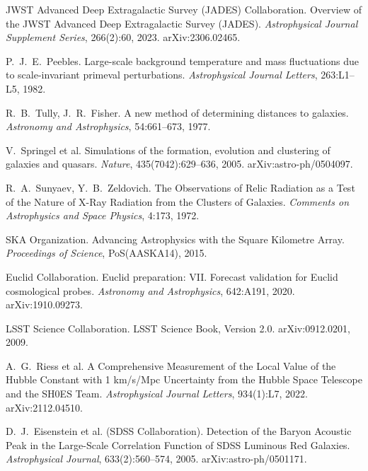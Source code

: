 \documentclass[12pt,a4paper]{article}
\theoremstyle{definition}
\theoremstyle{remark}
\begin{document}
\begin{thebibliography}{99}
JWST Advanced Deep Extragalactic Survey (JADES) Collaboration.
\newblock Overview of the JWST Advanced Deep Extragalactic Survey (JADES).
\newblock \emph{Astrophysical Journal Supplement Series}, 266(2):60, 2023. arXiv:2306.02465.

P.~J.~E.~Peebles.
\newblock Large-scale background temperature and mass fluctuations due to scale-invariant primeval perturbations.
\newblock \emph{Astrophysical Journal Letters}, 263:L1--L5, 1982.

R.~B.~Tully, J.~R.~Fisher.
\newblock A new method of determining distances to galaxies.
\newblock \emph{Astronomy and Astrophysics}, 54:661--673, 1977.

V.~Springel et al.
\newblock Simulations of the formation, evolution and clustering of galaxies and quasars.
\newblock \emph{Nature}, 435(7042):629--636, 2005. arXiv:astro-ph/0504097.

R.~A.~Sunyaev, Y.~B.~Zeldovich.
\newblock The Observations of Relic Radiation as a Test of the Nature of X-Ray Radiation from the Clusters of Galaxies.
\newblock \emph{Comments on Astrophysics and Space Physics}, 4:173, 1972.

SKA Organization.
\newblock Advancing Astrophysics with the Square Kilometre Array.
\newblock \emph{Proceedings of Science}, PoS(AASKA14), 2015.

Euclid Collaboration.
\newblock Euclid preparation: VII. Forecast validation for Euclid cosmological probes.
\newblock \emph{Astronomy and Astrophysics}, 642:A191, 2020. arXiv:1910.09273.

LSST Science Collaboration.
\newblock LSST Science Book, Version 2.0.
\newblock arXiv:0912.0201, 2009.

A.~G.~Riess et al.
\newblock A Comprehensive Measurement of the Local Value of the Hubble Constant with 1 km/s/Mpc Uncertainty from the Hubble Space Telescope and the SH0ES Team.
\newblock \emph{Astrophysical Journal Letters}, 934(1):L7, 2022. arXiv:2112.04510.

D.~J.~Eisenstein et al. (SDSS Collaboration).
\newblock Detection of the Baryon Acoustic Peak in the Large-Scale Correlation Function of SDSS Luminous Red Galaxies.
\newblock \emph{Astrophysical Journal}, 633(2):560--574, 2005. arXiv:astro-ph/0501171.

\end{thebibliography}
\end{document}
